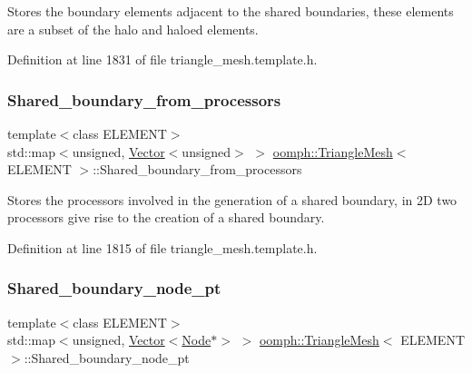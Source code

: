 Stores the boundary elements adjacent to the shared boundaries, these elements are a subset of the halo and haloed elements. 



Definition at line 1831 of file triangle\+\_\+mesh.\+template.\+h.

\mbox{\label{classoomph_1_1TriangleMesh_a48491979123f1e1ca1d669c52e255dc1}} 
\subsubsection{\texorpdfstring{Shared\+\_\+boundary\+\_\+from\+\_\+processors}{Shared\_boundary\_from\_processors}}
{\footnotesize\ttfamily template$<$class E\+L\+E\+M\+E\+NT$>$ \\
std\+::map$<$unsigned, \hyperlink{classoomph_1_1Vector}{Vector}$<$unsigned$>$ $>$ \hyperlink{classoomph_1_1TriangleMesh}{oomph\+::\+Triangle\+Mesh}$<$ E\+L\+E\+M\+E\+NT $>$\+::Shared\+\_\+boundary\+\_\+from\+\_\+processors\hspace{0.3cm}{\ttfamily [protected]}}



Stores the processors involved in the generation of a shared boundary, in 2D two processors give rise to the creation of a shared boundary. 



Definition at line 1815 of file triangle\+\_\+mesh.\+template.\+h.

\mbox{\label{classoomph_1_1TriangleMesh_a73973f1a76bb9ff555e75b727c676d82}} 
\subsubsection{\texorpdfstring{Shared\+\_\+boundary\+\_\+node\+\_\+pt}{Shared\_boundary\_node\_pt}}
{\footnotesize\ttfamily template$<$class E\+L\+E\+M\+E\+NT$>$ \\
std\+::map$<$unsigned, \hyperlink{classoomph_1_1Vector}{Vector}$<$\hyperlink{classoomph_1_1Node}{Node}$\ast$$>$ $>$ \hyperlink{classoomph_1_1TriangleMesh}{oomph\+::\+Triangle\+Mesh}$<$ E\+L\+E\+M\+E\+NT $>$\+::Shared\+\_\+boundary\+\_\+node\+\_\+pt\hspace{0.3cm}{\ttfamily [protected]}}



